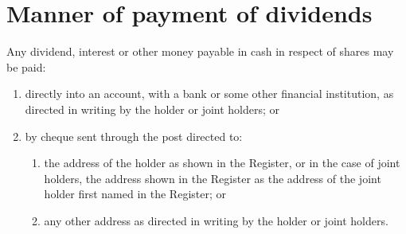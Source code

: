 \section{Manner of payment of dividends}

Any dividend, interest or other money payable in cash in respect of shares may be paid:

\begin{enumerate}[label=(\alph*)]
    \item directly into an account, with a bank or some other financial institution, as directed in writing by the holder or joint holders; or
    
    \item by cheque sent through the post directed to:
    \begin{enumerate}[label=(\roman*)]
        \item the address of the holder as shown in the Register, or in the case of joint holders, the address shown in the Register as the address of the joint holder first named in the Register; or
        \item any other address as directed in writing by the holder or joint holders.
    \end{enumerate}
\end{enumerate} 